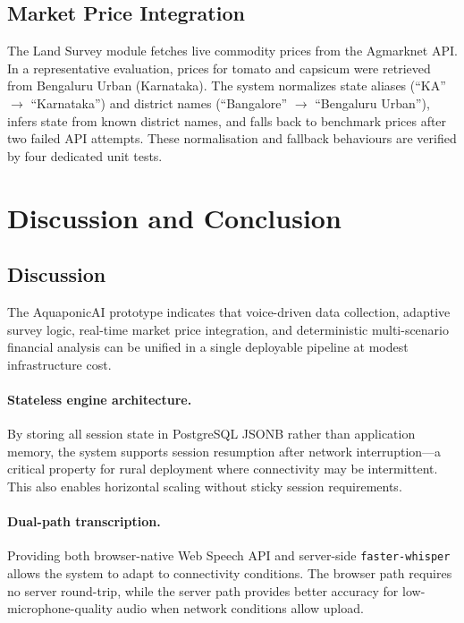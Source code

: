 \documentclass[runningheads]{llncs}
\begin{document}
\subsection{Market Price Integration}

The Land Survey module fetches live commodity prices from the
Agmarknet API. In a representative evaluation, prices for tomato and
capsicum were retrieved from Bengaluru Urban (Karnataka). The system
normalizes state aliases (``KA'' $\rightarrow$ ``Karnataka'') and
district names (``Bangalore'' $\rightarrow$ ``Bengaluru Urban''),
infers state from known district names, and falls back to benchmark
prices after two failed API attempts. These normalisation and fallback
behaviours are verified by four dedicated unit tests.


\section{Discussion and Conclusion}
\label{sec:conclusion}

\subsection{Discussion}

The AquaponicAI prototype indicates that voice-driven data collection,
adaptive survey logic, real-time market price integration, and
deterministic multi-scenario financial analysis can be unified in a
single deployable pipeline at modest infrastructure cost.

\paragraph{Stateless engine architecture.}
By storing all session state in PostgreSQL JSONB rather than
application memory, the system supports session resumption after
network interruption---a critical property for rural deployment where
connectivity may be intermittent. This also enables horizontal scaling
without sticky session requirements.

\paragraph{Dual-path transcription.}
Providing both browser-native Web Speech API and server-side
\texttt{faster-whisper} allows the system to adapt to connectivity
conditions. The browser path requires no server round-trip, while the
server path provides better accuracy for low-microphone-quality audio
when network conditions allow upload.
\end{document}
